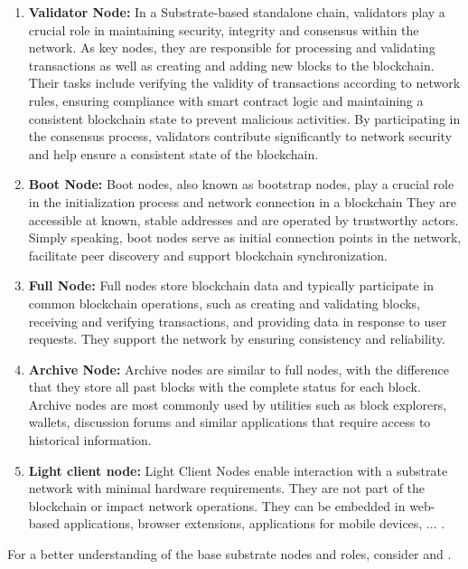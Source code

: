 \documentclass[]{article}
\begin{document}
\begin{enumerate}[label=\textbullet]
	\item\textbf{Validator Node:} 
    In a Substrate-based standalone chain, validators play a crucial role in maintaining security, integrity and consensus within the network. 
    As key nodes, they are responsible for processing and validating transactions as well as creating and adding new blocks to the blockchain. 
    Their tasks include verifying the validity of transactions according to network rules, ensuring compliance with smart contract logic and maintaining a consistent blockchain state to prevent malicious activities. 
    By participating in the consensus process, validators contribute significantly to network security and help ensure a consistent state of the blockchain. 

	\item\textbf{Boot Node:}
    Boot nodes, also known as bootstrap nodes, play a crucial role in the initialization process and network connection in a blockchain
    They are accessible at known, stable addresses and are operated by trustworthy actors.	
	Simply speaking, boot nodes serve as initial connection points in the network, facilitate peer discovery and support blockchain synchronization.
	
	\item\textbf{Full Node:}
	Full nodes store blockchain data and typically participate in common blockchain operations, such as creating and validating blocks, receiving and verifying transactions, and providing data in response to user requests. 
	They support the network by ensuring consistency and reliability. 

	\item\textbf{Archive Node:} 
	Archive nodes are similar to full nodes, with the difference that they store all past blocks with the complete status for each block. 
	Archive nodes are most commonly used by utilities such as block explorers, wallets, discussion forums and similar applications that require access to historical information.     
	
	\item\textbf{Light client node:} 
    Light Client Nodes enable interaction with a substrate network with minimal hardware requirements. They are not part of the blockchain or impact network operations. 
    They can be embedded in web-based applications, browser extensions, applications for mobile devices, ... .      
\end{enumerate}
For a better understanding of the base substrate nodes and roles, consider \cite{SubstrateDoc-node} and \cite{SubstrateDoc-roles}.
\end{document}
